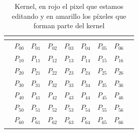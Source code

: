 \begin{table}[h]
\centering
\begin{tabular}{l|c|c|c|c|c|c|c|l}
 & \multicolumn{1}{l|}{}       & \multicolumn{1}{l|}{}      & \multicolumn{1}{l|}{}       & \multicolumn{1}{l|}{}       & \multicolumn{1}{l|}{}       & \multicolumn{1}{l|}{}       & \multicolumn{1}{l|}{}      &  \\ \hline
 & \cellcolor[HTML]{FAFE8E}$P_{00}$ & \cellcolor[HTML]{FAFE8E}$P_{01}$  & \cellcolor[HTML]{FAFE8E}$P_{02}$  & \cellcolor[HTML]{FAFE8E}$P_{03}$  & \cellcolor[HTML]{FAFE8E}$P_{04}$  & \cellcolor[HTML]{FAFE8E}$P_{05}$ & \cellcolor[HTML]{FAFE8E}$P_{06}$ &  \\ \hline
 & \cellcolor[HTML]{FAFE8E}$P_{10}$ & \cellcolor[HTML]{FAFE8E}$P_{11}$  & \cellcolor[HTML]{FAFE8E}$P_{12}$  & \cellcolor[HTML]{FAFE8E}$P_{13}$  & \cellcolor[HTML]{FAFE8E}$P_{14}$  & \cellcolor[HTML]{FAFE8E}$P_{15}$ & \cellcolor[HTML]{FAFE8E}$P_{16}$ &  \\ \hline
 & \cellcolor[HTML]{FAFE8E}$P_{20}$ & \cellcolor[HTML]{FAFE8E}$P_{21}$  & \cellcolor[HTML]{FAFE8E}$P_{22}$  & \cellcolor[HTML]{FAFE8E}$P_{23}$  & \cellcolor[HTML]{FAFE8E}$P_{24}$  & \cellcolor[HTML]{FAFE8E}$P_{25}$ & \cellcolor[HTML]{FAFE8E}$P_{26}$ &  \\ \hline
 & \cellcolor[HTML]{FAFE8E}$P_{30}$ & \cellcolor[HTML]{FAFE8E}$P_{31}$  & \cellcolor[HTML]{FAFE8E}$P_{32}$  & \cellcolor[HTML]{FE8E8E}$P_{33}$  & \cellcolor[HTML]{FAFE8E}$P_{34}$  & \cellcolor[HTML]{FAFE8E}$P_{35}$ & \cellcolor[HTML]{FAFE8E}$P_{36}$ &  \\ \hline
 & \cellcolor[HTML]{FAFE8E}$P_{40}$ & \cellcolor[HTML]{FAFE8E}$P_{41}$  & \cellcolor[HTML]{FAFE8E}$P_{42}$  & \cellcolor[HTML]{FAFE8E}$P_{43}$  & \cellcolor[HTML]{FAFE8E}$P_{44}$  & \cellcolor[HTML]{FAFE8E}$P_{45}$ & \cellcolor[HTML]{FAFE8E}$P_{46}$ &  \\ \hline
 & \cellcolor[HTML]{FAFE8E}$P_{50}$ & \cellcolor[HTML]{FAFE8E}$P_{51}$  & \cellcolor[HTML]{FAFE8E}$P_{52}$  & \cellcolor[HTML]{FAFE8E}$P_{53}$  & \cellcolor[HTML]{FAFE8E}$P_{54}$  & \cellcolor[HTML]{FAFE8E}$P_{55}$ & \cellcolor[HTML]{FAFE8E}$P_{56}$ &  \\ \hline
 & \cellcolor[HTML]{FAFE8E}$P_{60}$ & \cellcolor[HTML]{FAFE8E}$P_{61}$  & \cellcolor[HTML]{FAFE8E}$P_{62}$  & \cellcolor[HTML]{FAFE8E}$P_{63}$  & \cellcolor[HTML]{FAFE8E}$P_{64}$  & \cellcolor[HTML]{FAFE8E}$P_{65}$ & \cellcolor[HTML]{FAFE8E}$P_{66}$ &  \\ \hline
 & \multicolumn{1}{l|}{}      & \multicolumn{1}{l|}{}      & \multicolumn{1}{l|}{}       & \multicolumn{1}{l|}{}       & \multicolumn{1}{l|}{}       & \multicolumn{1}{l|}{}       & \multicolumn{1}{l|}{}      &
\end{tabular}
\caption{Kernel, en rojo el pixel que estamos editando y en amarillo los píxeles que forman parte del kernel}
\end{table}


